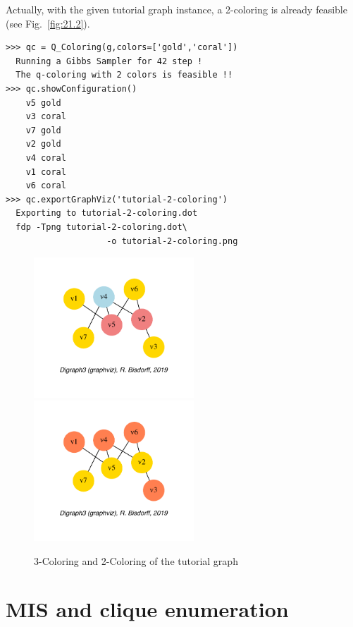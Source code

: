 Actually, with the given tutorial graph instance, a 2-coloring is already feasible (see Fig.~\vref{fig:21.2}).
\begin{lstlisting}
>>> qc = Q_Coloring(g,colors=['gold','coral'])
  Running a Gibbs Sampler for 42 step !
  The q-coloring with 2 colors is feasible !!
>>> qc.showConfiguration()
    v5 gold
    v3 coral
    v7 gold
    v2 gold
    v4 coral
    v1 coral
    v6 coral
>>> qc.exportGraphViz('tutorial-2-coloring')
  Exporting to tutorial-2-coloring.dot
  fdp -Tpng tutorial-2-coloring.dot\
                    -o tutorial-2-coloring.png
\end{lstlisting}
\begin{figure}[ht]
\includegraphics[width=6cm]{Figures/21-2-tutorial-3-coloring.pdf}\hfill
\includegraphics[width=6cm]{Figures/21-2-tutorial-2-coloring.pdf}
\caption{3-Coloring and 2-Coloring of the tutorial graph} 
\label{fig:21.2}       %
\end{figure}

\section{MIS and clique enumeration}
\label{sec:21.3}

